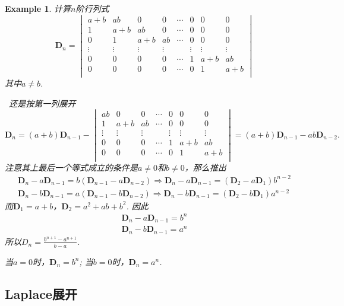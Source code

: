 \documentclass{article}
\newtheorem{example}[theorem]{Example}
\newcommand{\hints}{{\color{blue} \text{hints}}}
\newcommand{\mbf}[1]{\bm{#1}}
\begin{document}
\begin{example}
\rm 计算$n$阶行列式
$$
\mbf{D}_n = \begin{vmatrix}
a+b & ab & 0 & 0 & \cdots & 0 & 0 & 0\\
1 & a+b & ab & 0 & \cdots & 0 & 0 & 0\\
0 & 1 & a+b & ab & \cdots & 0 & 0 & 0\\
\vdots & \vdots & \vdots & \vdots & & \vdots & \vdots & \vdots\\
0 & 0 & 0 & 0 & \cdots & 1 & a+b & ab\\
0 & 0 & 0 & 0 & \cdots & 0 & 1 & a+b\\
\end{vmatrix}
$$
其中$a \neq b$.

\hints\ 还是按第一列展开
$$
\mbf{D}_n = (a+b)\mbf{D}_{n-1}-\begin{vmatrix}
 ab & 0 & 0 & \cdots & 0 & 0 & 0\\
 1 & a+b & ab & \cdots & 0 & 0 & 0\\
 \vdots & \vdots & \vdots & & \vdots & \vdots & \vdots\\
 0 & 0 & 0 & \cdots & 1 & a+b & ab\\
 0 & 0 & 0 & \cdots & 0 & 1 & a+b\\ 
\end{vmatrix} = (a+b)\mbf{D}_{n-1} -ab\mbf{D}_{n-2}. 
$$
注意其上最后一个等式成立的条件是$a \neq 0$和$b \neq 0$，那么推出
$$
\begin{array}{ll}
\mbf{D}_n - a\mbf{D}_{n-1} = b(\mbf{D}_{n-1}-a\mbf{D}_{n-2}) \Rightarrow \mbf{D}_n -a\mbf{D}_{n-1} = (\mbf{D}_2 - a\mbf{D}_1)b^{n-2}  \\
\mbf{D}_n - b\mbf{D}_{n-1} = a(\mbf{D}_{n-1}-b\mbf{D}_{n-2}) \Rightarrow \mbf{D}_n -b\mbf{D}_{n-1} = (\mbf{D}_2 - b\mbf{D}_1)a^{n-2}
\end{array}
$$
而$\mbf{D}_1 = a+b$，$\mbf{D}_2 = a^2 + ab + b^2$. 因此
$$
\begin{array}{ll}
\mbf{D}_n -a\mbf{D}_{n-1}  = b^n \\
\mbf{D}_n -b\mbf{D}_{n-1}  = a^n
\end{array}
$$
所以$D_n  = \frac{b^{n+1}-a^{n+1}}{b-a}$. 

当$a = 0$时，$\mbf{D}_n = b^n$; 当$b=0$时，$\mbf{D}_n=a^n$. 
\end{example}

\subsection{Laplace展开}
\end{document}
